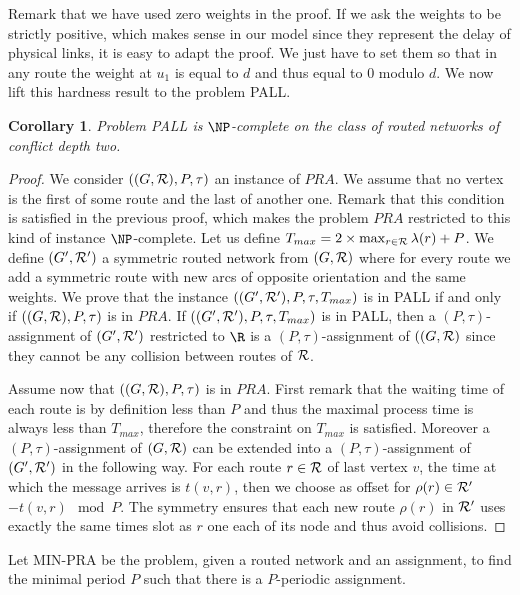 \documentclass[a4paper,10pt]{article}
\newtheorem{corollary}{Corollary}
\begin{document}
{ Remark that we have used zero weights in the proof. If we ask the weights to be strictly positive, which makes sense in our model since
they represent the delay of physical links, it is easy to adapt the proof. We just have to set them so that in any route the weight at $u_1$ is equal to $d$ and thus equal to $0$ modulo $d$. We now lift this hardness result to the problem PALL.

\begin{corollary}
Problem PALL is $\NP$-complete on the class of routed networks of conflict depth two.
\end{corollary}
\begin{proof}
 We consider $((G,{\cal R}),P,\tau)$ an instance of $PRA$. We assume that no vertex is the first of some route and the last of another one. Remark that this condition is satisfied in the previous proof, which makes the problem $PRA$ restricted to this kind of instance $\NP$-complete. 
 Let us define $T_{max} = 2 \times \max_{r \in {\cal R}} \lambda(r) + P$. We define $(G',{\cal R}')$ a symmetric routed network from $(G,{\cal R})$ where for every route we add a symmetric route with new arcs of opposite orientation and the same weights.
 We prove that the instance $((G',{\cal R'}),P,\tau,T_{max})$ is in PALL if and only if $((G,{\cal R}),P,\tau)$ is in $PRA$.
 If $((G',{\cal R'}),P,\tau,T_{max})$ is in PALL, then a $(P,\tau)$-assignment of $(G',{\cal R'})$ restricted to $\R$ is a $(P,\tau)$-assignment of $((G,{\cal R})$ since they cannot be any collision between routes of ${\cal R}$.
 
 Assume now that $((G,{\cal R}),P,\tau)$ is in $PRA$. First remark that the waiting time of each route is by definition less than $P$ and thus the maximal process time is always less than $T_{max}$, therefore the constraint on $T_{max}$ is satisfied. Moreover a $(P,\tau)$-assignment of $(G,{\cal R})$ can be extended into a $(P,\tau)$-assignment of $(G',{\cal R'})$ in the following way. For each route $r \in \cal{R}$ of last vertex $v$, the time at which the message arrives is $t(v,r)$, then we choose as offset for $\rho(r) \in \cal{R}'$ $-t(v,r) \mod P$. The symmetry ensures that each new route $\rho(r)$ in ${\cal R'}$ uses exactly the same times slot as $r$ one each of its node and thus avoid collisions.
\end{proof}

Let MIN-PRA be the problem, given a routed network and an assignment, to find the minimal period $P$ such that there is a $P$-periodic assignment. 

}
\end{document}
